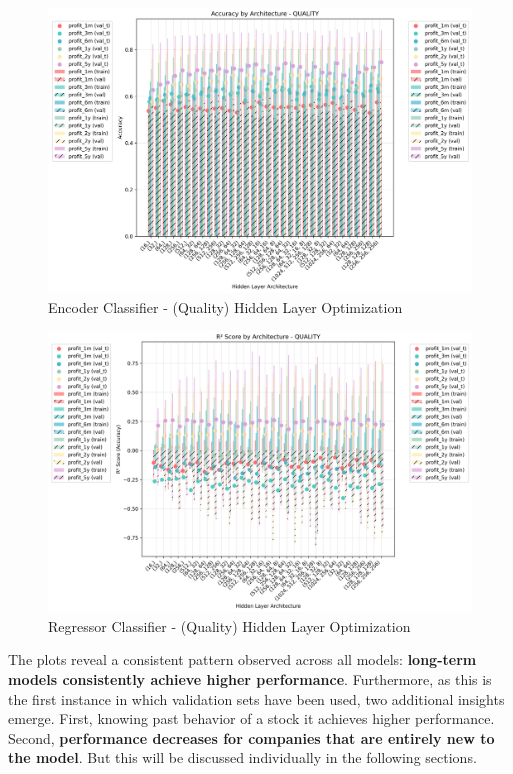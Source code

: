 \documentclass[11pt,english,a4paper,hidelinks]{book}
\begin{document}
\begin{figure}[H]
    \centering
    \includegraphics[width=1\textwidth]{images/code/models/neural_network/binary_classifier_nn/class_architecture_analysis_quality.png}
    \caption{Encoder Classifier - (Quality) Hidden Layer Optimization}
    \label{fig:encoder_quality_hidden_layer}
\end{figure}

\begin{figure}[H]
    \centering
    \includegraphics[width=1\textwidth]{images/code/models/neural_network/regressor_nn/reg_architecture_analysis_quality.png}
    \caption{Regressor Classifier - (Quality) Hidden Layer Optimization}
    \label{fig:regressor_quality_hidden_layer}
\end{figure}

\noindent The plots reveal a consistent pattern observed across all models: \textbf{long-term models consistently achieve higher performance}. Furthermore, as this is the first instance in which validation sets have been used, two additional insights emerge. First, knowing past behavior of a stock it achieves higher performance. Second, \textbf{performance decreases for companies that are entirely new to the model}. But this will be discussed individually in the following sections.
\end{document}
